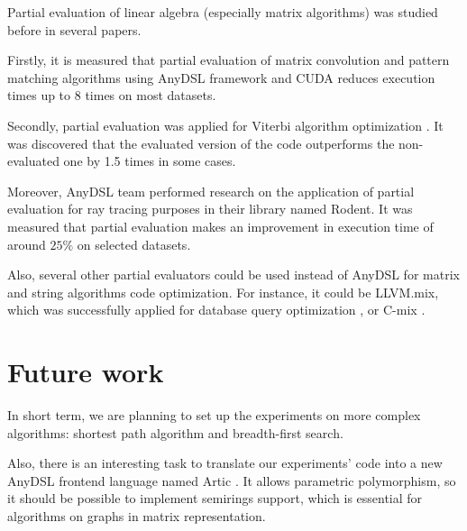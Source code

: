 \documentclass[conference]{IEEEtran}
\begin{document}
Partial evaluation of linear algebra (especially matrix algorithms) was studied before in several papers.

Firstly, it is measured \cite{tyurin2020optimizing} that partial evaluation of matrix convolution and pattern matching algorithms using AnyDSL framework and CUDA reduces execution times up to 8 times on most datasets.

Secondly, partial evaluation was applied for Viterbi algorithm optimization \cite{viterbiseim}. It was discovered that the evaluated version of the code outperforms the non-evaluated one by 1.5 times in some cases.

Moreover, AnyDSL team performed research \cite{perard2019rodent} on the application of partial evaluation for ray tracing purposes in their library named Rodent. It was measured that partial evaluation makes an improvement in execution time of around $25\%$ on selected datasets.

Also, several other partial evaluators could be used instead of AnyDSL for matrix and string algorithms code optimization. For instance, it could be LLVM.mix, which was successfully applied for database query optimization \cite{sharygin2017runtime}, or C-mix \cite{jones1993partial}.

\section{Future work}

In short term, we are planning to set up the experiments on more complex algorithms: shortest path algorithm and breadth-first search.

Also, there is an interesting task to translate our experiments' code into a new AnyDSL frontend language named Artic \cite{articgit}. It allows parametric polymorphism, so it should be possible to implement semirings support, which is essential for algorithms on graphs in matrix representation.




\end{document}
